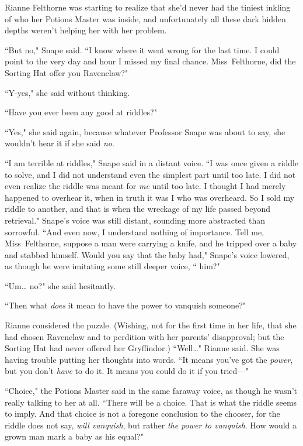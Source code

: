 Rianne Felthorne was starting to realize that she'd never had the tiniest inkling of who her Potions Master was inside, and unfortunately all these dark hidden depths weren't helping her with her problem.

``But no," Snape said. ``I know where it went wrong for the last time. I could point to the very day and hour I missed my final chance. Miss~Felthorne, did the Sorting Hat offer you Ravenclaw?"

``Y-yes," she said without thinking.

``Have you ever been any good at riddles?"

``Yes," she said again, because whatever Professor Snape was about to say, she wouldn't hear it if she said \emph{no}.

``I am terrible at riddles," Snape said in a distant voice. ``I was once given a riddle to solve, and I did not understand even the simplest part until too late. I did not even realize the riddle was meant for \emph{me} until too late. I thought I had merely happened to overhear it, when in truth it was I who was overheard. So I sold my riddle to another, and that is when the wreckage of my life passed beyond retrieval." Snape's voice was still distant, sounding more abstracted than sorrowful. ``And even now, I understand nothing of importance. Tell me, Miss~Felthorne, suppose a man were carrying a knife, and he tripped over a baby and stabbed himself. Would you say that the baby had," Snape's voice lowered, as though he were imitating some still deeper voice, `` him?"

``Um{\ldots} no?" she said hesitantly.

``Then what \emph{does} it mean to have the power to vanquish someone?"

Rianne considered the puzzle. (Wishing, not for the first time in her life, that she had chosen Ravenclaw and to perdition with her parents' disapproval; but the Sorting Hat had never offered her Gryffindor.) ``Well{\ldots}" Rianne said. She was having trouble putting her thoughts into words. ``It means you've got the \emph{power}, but you don't \emph{have} to do it. It means you could do it if you tried---"

``Choice," the Potions Master said in the same faraway voice, as though he wasn't really talking to her at all. ``There will be a choice. That is what the riddle seems to imply. And that choice is not a foregone conclusion to the chooser, for the riddle does not say, \emph{will vanquish}, but rather \emph{the power to vanquish}. How would a grown man mark a baby as his equal?"

